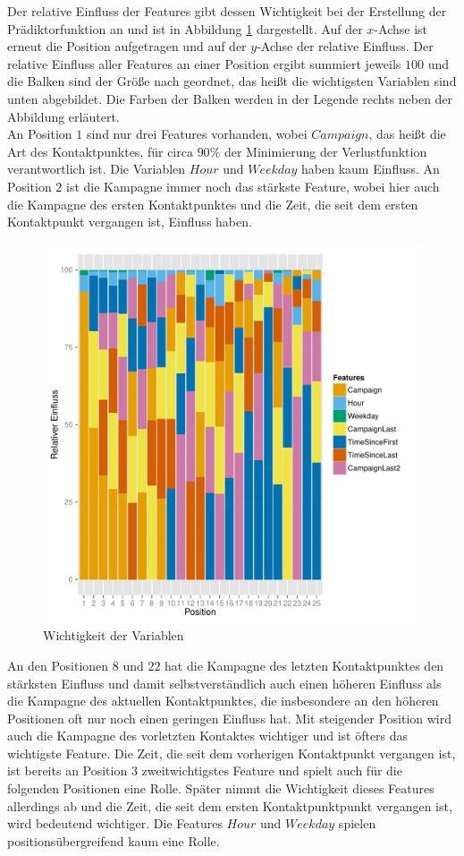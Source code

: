 Der relative Einfluss der Features gibt dessen Wichtigkeit bei der Erstellung der Prädiktorfunktion an und ist in Abbildung \ref{variable_importance} dargestellt. Auf der $x$-Achse ist erneut die Position aufgetragen und auf der $y$-Achse der relative Einfluss. Der relative Einfluss aller Features an einer Position ergibt summiert jeweils $100$ und die Balken sind der Größe nach geordnet, das heißt die wichtigsten Variablen sind unten abgebildet. Die Farben der Balken werden in der Legende rechts neben der Abbildung erläutert.\\
An Position $1$ sind nur drei Features vorhanden, wobei $Campaign$, das heißt die Art des Kontaktpunktes, für circa $90 \%$ der Minimierung der Verlustfunktion verantwortlich ist. Die Variablen $Hour$ und $Weekday$ haben kaum Einfluss. An Position $2$ ist die Kampagne immer noch das stärkste Feature, wobei hier auch die Kampagne des ersten Kontaktpunktes und die Zeit, die seit dem ersten Kontaktpunkt vergangen ist, Einfluss haben.\\
\begin{figure}[H]
	\centering\includegraphics[scale=0.9]{variableImportance.pdf}\caption{Wichtigkeit der Variablen}\label{variable_importance}
\end{figure}
An den Positionen $8$ und $22$ hat die Kampagne des letzten Kontaktpunktes den stärksten Einfluss und damit selbstverständlich auch einen höheren Einfluss als die Kampagne des aktuellen Kontaktpunktes, die insbesondere an den höheren Positionen oft nur noch einen geringen Einfluss hat. Mit steigender Position wird auch die Kampagne des vorletzten Kontaktes wichtiger und ist öfters das wichtigste Feature. Die Zeit, die seit dem vorherigen Kontaktpunkt vergangen ist, ist bereits an Position $3$ zweitwichtigstes Feature und spielt auch für die folgenden Positionen eine Rolle. Später nimmt die Wichtigkeit dieses Features allerdings ab und die Zeit, die seit dem ersten Kontaktpunktpunkt vergangen ist, wird bedeutend wichtiger. Die Features $Hour$ und $Weekday$ spielen positionsübergreifend kaum eine Rolle.\\
